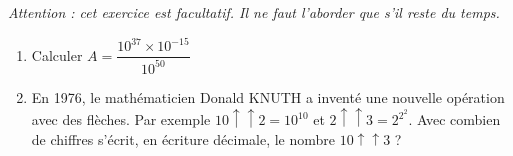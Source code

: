 

\vspace*{5mm}

\textit{ Attention : cet exercice est facultatif. Il ne faut l'aborder que s'il reste du temps.}

\exo
\begin{enumerate}

\item Calculer $A = \dfrac{10^{37} \times 10 ^{-15}}{10^{50}}$

\item En 1976, le mathématicien Donald KNUTH a inventé une nouvelle opération avec des flèches. Par exemple $10 \uparrow \uparrow 2 = 10 ^{10} $ et $ 2 \uparrow \uparrow 3 = 2^{2^{2}} $. Avec combien de chiffres s'écrit, en écriture décimale, le nombre $10 \uparrow \uparrow 3$ ?  

\end{enumerate}

